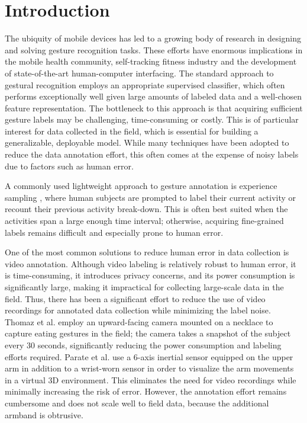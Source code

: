 \documentclass{sigchi}
\begin{document}


\section{Introduction}

The ubiquity of mobile devices has led to a growing body of research in designing and solving gesture recognition tasks. These efforts have enormous implications in the mobile health community, self-tracking fitness industry and the development of state-of-the-art human-computer interfacing. The standard approach to gestural recognition employs an appropriate supervised classifier, which often performs exceptionally well given large amounts of labeled data and a well-chosen feature representation. The bottleneck to this approach is that acquiring sufficient gesture labels may be challenging, time-consuming or costly. This is of particular interest for data collected in the field, which is essential for building a generalizable,  deployable model. While many techniques have been adopted to reduce the data annotation effort, this often comes at the expense of noisy labels due to factors such as human error.

A commonly used lightweight approach to gesture annotation is experience sampling \cite{Froehlich:2007:MSS:1247660.1247670}, where human subjects are prompted to label their current activity or recount their previous activity break-down. This is often best suited when the activities span a large enough time interval; otherwise, acquiring fine-grained labels remains difficult and especially prone to human error.

One of the most common solutions to reduce human error in data collection is video annotation. Although video labeling is relatively robust to human error, it is time-consuming, it introduces privacy concerns, and its power consumption is significantly large, making it impractical for collecting large-scale data in the field. Thus, there has been a significant effort to reduce the use of video recordings for annotated data collection while minimizing the label noise. Thomaz et al. \cite{Thomaz:2015} employ an upward-facing camera mounted on a necklace to capture eating gestures in the field; the camera takes a snapshot of the subject every 30 seconds, significantly reducing the power consumption and labeling efforts required. Parate et al. \cite{Parate:2014} use a 6-axis inertial sensor equipped on the upper arm in addition to a wrist-worn sensor in order to visualize the arm movements in a virtual 3D environment. This eliminates the need for video recordings while minimally increasing the risk of error. However, the annotation effort remains cumbersome and does not scale well to field data, because the additional armband is obtrusive.
\end{document}
